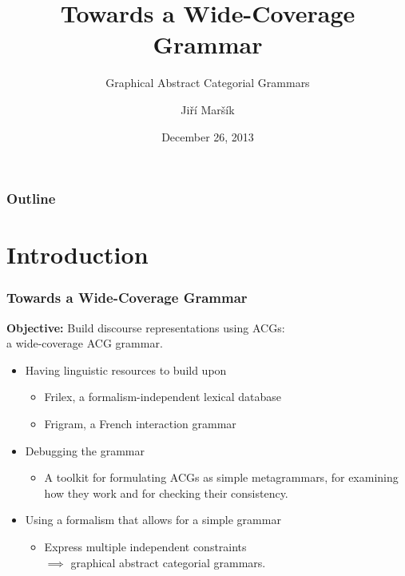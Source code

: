 \documentclass{beamer}
\begin{document}
\title[G-ACGs]{Towards a Wide-Coverage Grammar}
\subtitle{Graphical Abstract Categorial Grammars}
\author{Jiří Maršík}
\date[December 2013]{December 26, 2013}

\frame{\titlepage \setcounter{framenumber}{1}}

\begin{frame}
\frametitle{Outline}
\tableofcontents
\end{frame}

\section{Introduction}

\begin{frame}
  \frametitle{Towards a Wide-Coverage Grammar}

  \textbf{Objective:} Build discourse representations using ACGs: \\a
  wide-coverage ACG grammar.

  \vfill

  \begin{itemize}
  \item Having linguistic resources to build upon
    \begin{itemize}
    \item Frilex, a formalism-independent lexical database
    \item Frigram, a French interaction grammar
    \end{itemize}
    \vfill
  \item Debugging the grammar
    \begin{itemize}
    \item A toolkit for formulating ACGs as simple metagrammars, for
      examining how they work and for checking their consistency.
    \end{itemize}
    \vfill
  \item Using a formalism that allows for a simple grammar
    \begin{itemize}
    \item Express multiple independent constraints \\ $\implies$ graphical abstract categorial grammars.
    \end{itemize}
  \end{itemize}
\end{frame}
\end{document}
